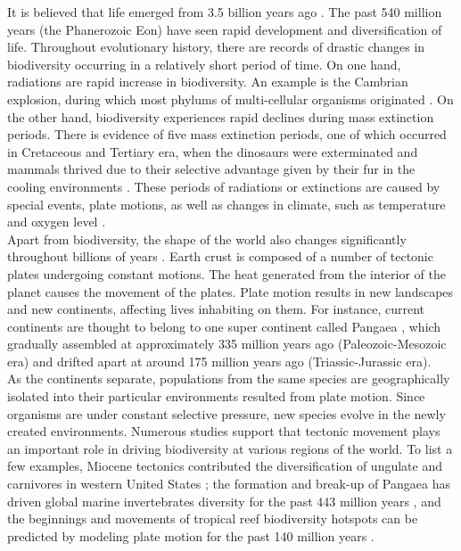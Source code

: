 \documentclass[11pt, a4paper,oneside,chapterprefix=false]{scrbook}
\begin{document}
It is believed that life emerged from 3.5 billion years ago \cite{algeo1998terrestrial}. The past 540 million years (the Phanerozoic Eon) have seen rapid development and diversification of life. Throughout evolutionary history, there are records of drastic changes in biodiversity occurring in a relatively short period of time. On one hand, radiations are rapid increase in biodiversity. An example is the Cambrian explosion, during which most phylums of multi-cellular organisms originated \cite{alroy2001effects}. On the other hand, biodiversity experiences rapid declines during mass extinction periods. There is evidence of five mass extinction periods, one of which occurred in Cretaceous and Tertiary era, when the dinosaurs were exterminated and mammals thrived due to their selective advantage given by their fur in the cooling environments \cite{courtillot2002evolutionary}. These periods of radiations or extinctions are caused by special events, plate motions, as well as changes in climate, such as temperature and oxygen level \cite{butterfield2009oxygen, svenning2007ice}. \\

Apart from biodiversity, the shape of the world also changes significantly throughout billions of years \cite{wilson1963continental}. Earth crust is composed of a number of tectonic plates undergoing constant motions. The heat generated from the interior of the planet causes the movement of the plates. Plate motion results in new landscapes and new continents, affecting lives inhabiting on them. For instance, current continents are thought to belong to one super continent called Pangaea \cite{stampfli2013formation}, which gradually assembled at approximately 335 million years ago (Paleozoic-Mesozoic era) and drifted apart at around 175 million years ago (Triassic-Jurassic era). \\

As the continents separate, populations from the same species are geographically isolated into their particular environments resulted from plate motion. Since organisms are under constant selective pressure, new species evolve in the newly created environments. Numerous studies support that tectonic movement plays an important role in driving biodiversity at various regions of the world. To list a few examples, Miocene tectonics contributed the diversification of ungulate and carnivores in western United States \cite{kohn2008miocene}; the formation and break-up of Pangaea has driven global marine invertebrates diversity for the past 443 million years \cite{zaffos2017plate}, and the beginnings and movements of tropical reef biodiversity hotspots can be predicted by modeling plate motion for the past 140 million years \cite{leprieur2016plate}. 
\end{document}
